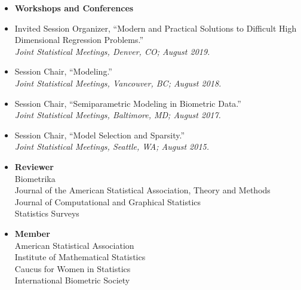 \documentclass[11pt]{article}
\newcommand{\tab}{\hspace*{2em}}
\begin{document}
\begin{itemize} 
	\item[] \textbf{Workshops and Conferences}  \vspace{-2mm}
	\item[] Invited Session Organizer, ``Modern and Practical Solutions to Difficult High Dimensional Regression Problems.'' \hfill   \\
	\tab \emph{Joint Statistical Meetings, Denver, CO; August 2019.}  \vspace{-2mm}
	\item[] Session Chair, ``Modeling.'' \hfill   \\
	\tab \emph{Joint Statistical Meetings, Vancouver, BC; August 2018.}  \vspace{-2mm}
	\item[] Session Chair, ``Semiparametric Modeling in Biometric Data.'' \hfill   \\
	\tab \emph{Joint Statistical Meetings, Baltimore, MD; August 2017.}  \vspace{-2mm}
	\item[] Session Chair, ``Model Selection and Sparsity.'' \hfill   \\
	\tab \emph{Joint Statistical Meetings, Seattle, WA; August 2015.}  \vspace{-2mm}
\end{itemize}

\begin{itemize}
	\item[] \textbf{Reviewer}  \\
	\tab Biometrika \\
	\tab Journal of the American Statistical Association, Theory and Methods \\
	\tab Journal of Computational and Graphical Statistics \\ 
	\tab Statistics Surveys\vspace{-2mm}
	\item[] \textbf{Member} \\
	\tab American Statistical Association \\
	\tab  Institute of Mathematical Statistics \\
	\tab Caucus for Women in Statistics \\
	\tab  International Biometric Society
\end{itemize}
\end{document}

